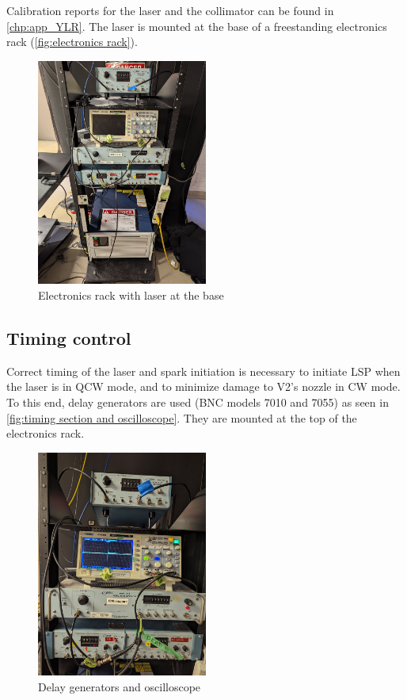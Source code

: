             Calibration reports for the laser and the collimator can be found in \autoref{chp:app_YLR}. The laser is mounted at the base of a freestanding electronics rack (\autoref{fig:electronics rack}).

            \begin{figure}[!ht]
                \centering
                \includegraphics[width=0.50\textwidth]{assets/3 design/Control rack.jpg}
                \caption{Electronics rack with laser at the base}
                \label{fig:electronics rack}
            \end{figure} 


        \subsection{Timing control}

            Correct timing of the laser and spark initiation is necessary to initiate LSP when the laser is in QCW mode, and to minimize damage to V2's nozzle in CW mode. To this end, delay generators are used (BNC models 7010 and 7055) as seen in \autoref{fig:timing section and oscilloscope}. They are mounted at the top of the electronics rack.

            \begin{figure}[!ht]
                \centering
                \includegraphics[width=0.50\textwidth]{assets/3 design/Timing rack and oscilloscope.jpg}
                \caption{Delay generators and oscilloscope}
                \label{fig:timing section and oscilloscope}
            \end{figure} 

